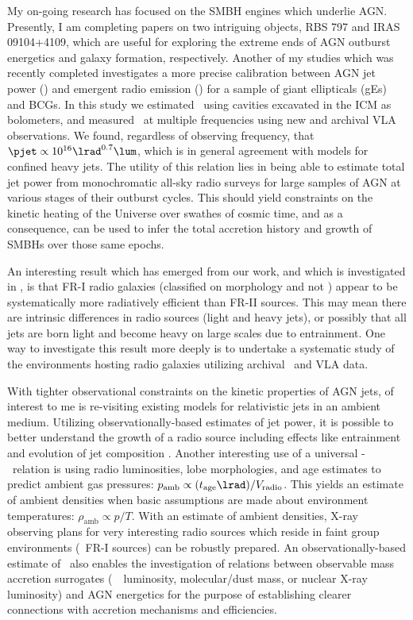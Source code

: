 \documentclass[12pt]{article}
\begin{document}
My on-going research has focused on the SMBH engines which underlie
AGN. Presently, I am completing papers on two intriguing objects, RBS
797 and IRAS 09104+4109, which are useful for exploring the extreme
ends of AGN outburst energetics and galaxy formation, respectively.
Another of my studies which was recently completed \cite{pjet}
investigates a more precise calibration between AGN jet power (\pjet)
and emergent radio emission (\lrad) for a sample of giant ellipticals
(gEs) and BCGs. In this study we estimated \pjet\ using cavities
excavated in the ICM as bolometers, and measured \lrad\ at multiple
frequencies using new and archival VLA observations. We found,
regardless of observing frequency, that $\pjet \propto 10^{16}
\lrad^{0.7} \lum$, which is in general agreement with models for
confined heavy jets. The utility of this relation lies in being able
to estimate total jet power from monochromatic all-sky radio surveys
for large samples of AGN at various stages of their outburst
cycles. This should yield constraints on the kinetic heating of the
Universe over swathes of cosmic time, and as a consequence, can be
used to infer the total accretion history and growth of SMBHs over
those same epochs.

An interesting result which has emerged from our work, and which is
investigated in \cite{2008MNRAS.386.1709C}, is that FR-I radio
galaxies (classified on morphology and not \lrad) appear to be
systematically more radiatively efficient than FR-II sources. This may
mean there are intrinsic differences in radio sources (light and heavy
jets), or possibly that all jets are born light and become heavy on
large scales due to entrainment. One way to investigate this result
more deeply is to undertake a systematic study of the environments
hosting radio galaxies utilizing archival \chandra\ and VLA data.

With tighter observational constraints on the kinetic properties of
AGN jets, of interest to me is re-visiting existing models for
relativistic jets in an ambient medium. Utilizing
observationally-based estimates of jet power, it is possible to better
understand the growth of a radio source including effects like
entrainment and evolution of jet composition \cite[\'a
la][]{1999MNRAS.309.1017W}. Another interesting use of a universal
\pjet-\lrad\ relation is using radio luminosities, lobe morphologies,
and age estimates to predict ambient gas pressures: $p_{\mathrm{amb}}
\propto (t_{\mathrm{age}}\lrad) / V_{\mathrm{radio}}$. This yields an
estimate of ambient densities when basic assumptions are made about
environment temperatures: $\rho_{\mathrm{amb}} \propto p/T$. With an
estimate of ambient densities, X-ray observing plans for very
interesting radio sources which reside in faint group environments
(\ie\ FR-I sources) can be robustly prepared. An observationally-based
estimate of \pjet\ also enables the investigation of relations between
observable mass accretion surrogates (\ie\ \halpha\ luminosity,
molecular/dust mass, or nuclear X-ray luminosity) and AGN energetics
for the purpose of establishing clearer connections with accretion
mechanisms and efficiencies.
\end{document}
